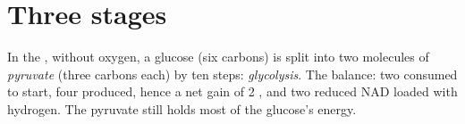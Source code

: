 \section{Three stages}

\begin{proposition}[Glycolysis]\label{prop:g12:respiration-fermentation:glycolysis}
In the , without oxygen, a glucose (six carbons) is split
into two molecules of \emph{pyruvate} (three carbons each) by ten
 steps: \emph{glycolysis}. The balance: two
 consumed to start, four produced, hence a net gain of 2 , and
two reduced NAD loaded with hydrogen. The pyruvate still holds most of
the glucose's energy.
\end{proposition}
\admitted

